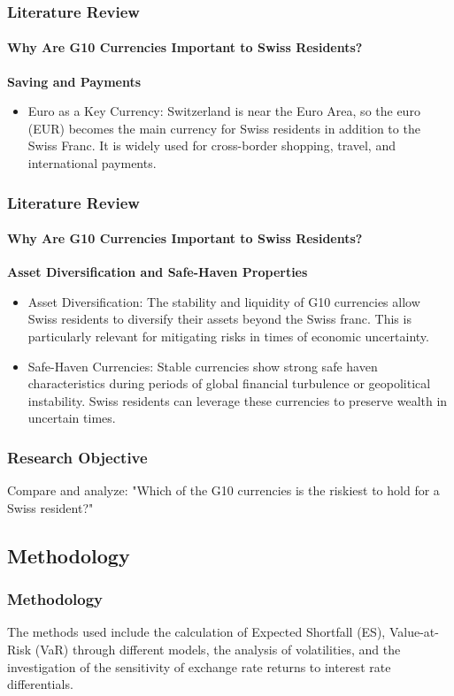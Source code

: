 \documentclass[10pt]{beamer}
\begin{document}
\begin{frame}
\frametitle{Literature Review}
\framesubtitle{Why Are G10 Currencies Important to Swiss Residents?}
\textbf{Saving and Payments}
\begin{itemize}
    \item Euro as a Key Currency: Switzerland is near the Euro Area, so the euro (EUR) becomes the main currency for Swiss residents in addition to the Swiss Franc. It is widely used for cross-border shopping, travel, and international payments.
\end{itemize}
\end{frame}
\begin{frame}
\frametitle{Literature Review}
\framesubtitle{Why Are G10 Currencies Important to Swiss Residents?}
\textbf{Asset Diversification and Safe-Haven Properties}   
\begin{itemize}
    \item Asset Diversification: The stability and liquidity of G10 currencies allow Swiss residents to diversify their assets beyond the Swiss franc. This is particularly relevant for mitigating risks in times of economic uncertainty.~\cite{ito2020currency}
    \item Safe-Haven Currencies: Stable currencies show strong safe haven characteristics during periods of global financial turbulence or geopolitical instability. Swiss residents can leverage these currencies to preserve wealth in uncertain times.~\cite{ranaldo2010safe}
\end{itemize}
\end{frame}
\begin{frame}
\frametitle{Research Objective}
Compare and analyze: "Which of the G10 currencies is the riskiest to hold for a Swiss resident?"
\end{frame}
\begin{frame}
\section{Methodology}
\frametitle{Methodology}
The methods used include the calculation of Expected Shortfall (ES), Value-at-Risk (VaR) through different models, the analysis of volatilities, and the investigation of the sensitivity of exchange rate returns to interest rate differentials.
\end{frame}
\end{document}

